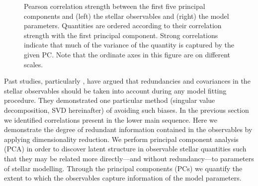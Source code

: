 {\begin{landscape}
\begin{figure}
\caption{ Pearson correlation strength between the first five principal components and (left) the stellar observables and (right) the model parameters.  Quantities are ordered according to their correlation strength with the first principal component.  Strong correlations indicate that much of the variance of the quantity is captured by the given PC. Note that the ordinate axes in this figure are on different scales. }
\label{fig:GCA-pcabar}
\end{figure}
\end{landscape}
}
\fi

Past studies, particularly \citet{1994ApJ...427.1013B}, have argued that redundancies and covariances in the stellar observables should be taken into account during any model fitting procedure. 
They demonstrated one particular method (singular value decomposition, SVD hereinafter) of avoiding such biases. In the previous section we identified correlations present in the lower main sequence. Here we demonstrate the degree of redundant information contained in the observables by applying dimensionality reduction. 
We perform principal component analysis (PCA) in order to discover latent structure in observable stellar quantities such that they may be related more directly---and without redundancy---to parameters of stellar modelling. 
Through the principal components (PCs) we quantify the extent to which the observables capture information of the model parameters.


